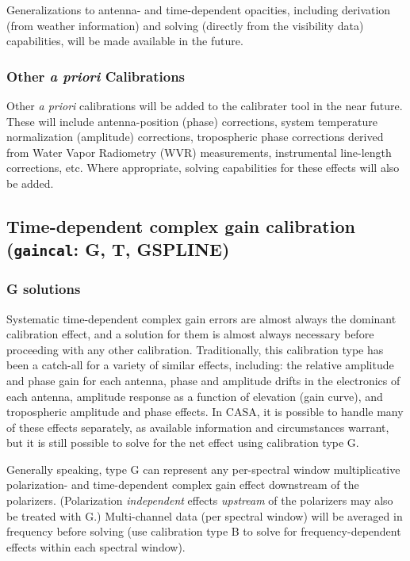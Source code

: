 Generalizations to antenna- and time-dependent opacities, including
derivation (from weather information) and solving (directly from the
visibility data) capabilities, will be made available in the future.

\subsubsection{Other {\it a priori} Calibrations}
\label{subsubsection:a.priori.other}

Other {\it a priori} calibrations will be added to the calibrater tool
in the near future.  These will include antenna-position (phase)
corrections, system temperature normalization (amplitude) corrections,
tropospheric phase corrections derived from Water Vapor Radiometry
(WVR) measurements, instrumental line-length corrections, etc.  Where
appropriate, solving capabilities for these effects will also be
added.

\subsection{Time-dependent complex gain calibration ({\tt gaincal}: G,
  T, GSPLINE)} 
\label{subsection:synth.gaincal}

\subsubsection{G solutions}
\label{subsubsection:synth.g.solns}

Systematic time-dependent complex gain errors are almost always the
dominant calibration effect, and a solution for them is almost always
necessary before proceeding with any other calibration.
Traditionally, this calibration type has been a catch-all for a
variety of similar effects, including: the relative amplitude and
phase gain for each antenna, phase and amplitude drifts in the
electronics of each antenna, amplitude response as a function of
elevation (gain curve), and tropospheric amplitude and phase effects.
In CASA, it is possible to handle many of these effects separately, as
available information and circumstances warrant, but it is still
possible to solve for the net effect using calibration type G.

Generally speaking, type G can represent any per-spectral window
multiplicative polarization- and time-dependent complex gain effect
downstream of the polarizers.  (Polarization {\it independent} effects
{\it upstream} of the polarizers may also be treated with G.)
Multi-channel data (per spectral window) will be averaged in frequency
before solving (use calibration type B to solve for
frequency-dependent effects within each spectral window).

